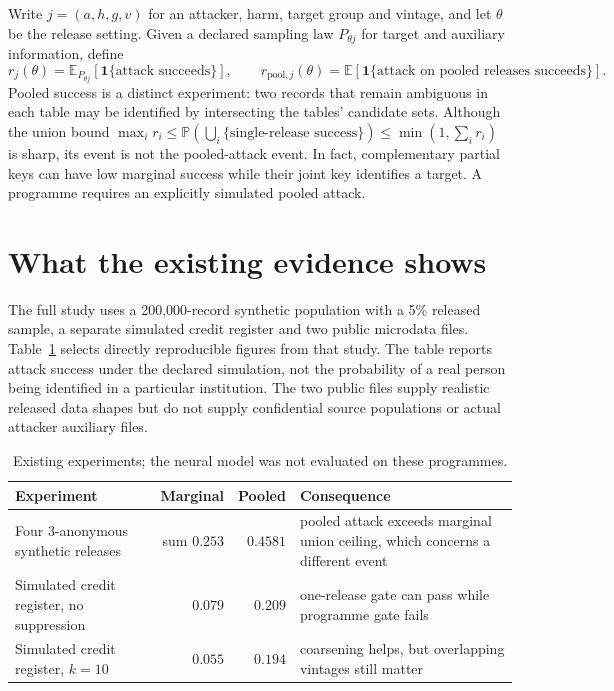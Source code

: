 \documentclass[10pt,a4paper]{article}
\newcommand{\Prob}{\mathbb P}
\newcommand{\E}{\mathbb E}
\begin{document}
Write $j=(a,h,g,v)$ for an attacker, harm, target group and vintage, and let $\theta$ be the release setting. Given a declared sampling law $P_{\theta j}$ for target and auxiliary information, define
\begin{equation}\label{eq:risk}
r_j(\theta)=\E_{P_{\theta j}}[\mathbf1\{\text{attack succeeds}\}],\qquad
r_{\mathrm{pool},j}(\theta)=\E[\mathbf1\{\text{attack on pooled releases succeeds}\}].
\end{equation}
Pooled success is a distinct experiment: two records that remain ambiguous in each table may be identified by intersecting the tables' candidate sets. Although the union bound $\max_i r_i\leq\Prob(\bigcup_i\{\text{single-release success}\})\leq\min(1,\sum_i r_i)$ is sharp, its event is not the pooled-attack event. In fact, complementary partial keys can have low marginal success while their joint key identifies a target. A programme requires an explicitly simulated pooled attack.

\section{What the existing evidence shows}
The full study uses a 200,000-record synthetic population with a 5\% released sample, a separate simulated credit register and two public microdata files. Table~\ref{tab:cases} selects directly reproducible figures from that study. The table reports attack success under the declared simulation, not the probability of a real person being identified in a particular institution. The two public files supply realistic released data shapes but do not supply confidential source populations or actual attacker auxiliary files.

\begin{table}[h]
\centering\small
\caption{Existing experiments; the neural model was not evaluated on these programmes.}\label{tab:cases}
\begin{tabular}{p{.39\linewidth}rrp{.24\linewidth}}
\toprule
Experiment & Marginal & Pooled & Consequence\\\midrule
Four 3-anonymous synthetic releases & sum $0.253$ & $0.4581$ & pooled attack exceeds marginal union ceiling, which concerns a different event\\
Simulated credit register, no suppression & $0.079$ & $0.209$ & one-release gate can pass while programme gate fails\\
Simulated credit register, $k=10$ & $0.055$ & $0.194$ & coarsening helps, but overlapping vintages still matter\\
\bottomrule
\end{tabular}
\end{table}
\end{document}
